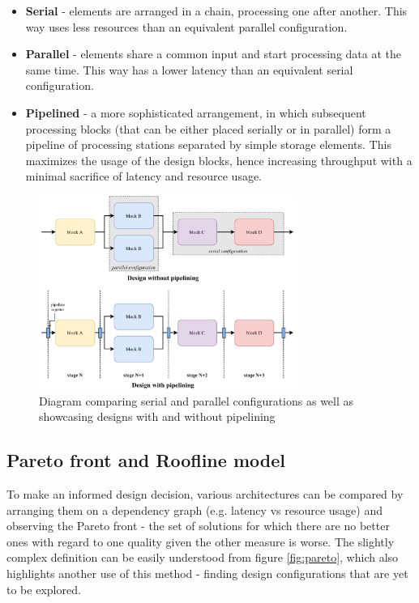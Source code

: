 \begin{itemize}
  \item \textbf{Serial} - elements are arranged in a chain, processing one after another. This way uses less resources than an equivalent parallel configuration.
  \item \textbf{Parallel} - elements share a common input and start processing data at the same time. This way has a lower latency than an equivalent serial configuration.
  \item \textbf{Pipelined} - a more sophisticated arrangement, in which subsequent processing blocks (that can be either placed serially or in parallel) form a pipeline of processing stations separated by simple storage elements. This maximizes the usage of the design blocks, hence increasing throughput with a minimal sacrifice of latency and resource usage.
\end{itemize}

\begin{figure}[hpt!]
  \centering
  \includegraphics[trim={0cm 0cm 0cm 0cm}, width=0.75\textwidth, center]{background/serial_parallel_pipelined.pdf}
  \caption{Diagram comparing serial and parallel configurations as well as showcasing designs with and without pipelining}
  \label{fig:serial-parallel-pipelined}
\end{figure}


\subsection{Pareto front and Roofline model}
To make an informed design decision, various architectures can be compared by arranging them on a dependency graph (e.g. latency vs resource usage) and observing the Pareto front - the set of solutions for which there are no better ones with regard to one quality given the other measure is worse. The slightly complex definition can be easily understood from figure \ref{fig:pareto}, which also highlights another use of this method - finding design configurations that are yet to be explored.

